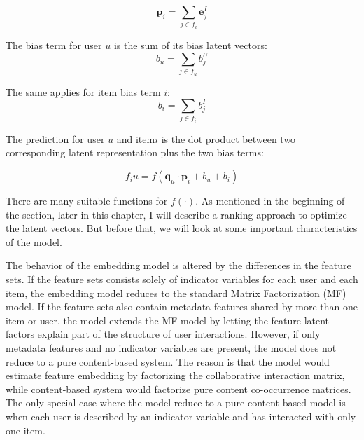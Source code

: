 \begin{displaymath}
\boldsymbol{p}_i = \sum_{j \in f_i} \boldsymbol{e}_j^I
\end{displaymath}

\noindent The bias term for user \(u\) is the sum of its bias latent vectors:
\begin{displaymath}
b_u = \sum_{j \in f_u} b_j^U
\end{displaymath}

\noindent The same applies for item bias term \(i\):
\begin{displaymath}
b_i = \sum_{j \in f_i} b_j^I
\end{displaymath}

The prediction for user \(u\) and item\(i\) is the dot product between two corresponding latent representation plus the two bias terms:

\begin{displaymath}
f_{i}u = f (\boldsymbol{q}_u  \cdot \boldsymbol{p}_i + b_u + b_i) \tag{2} \label{eq:2}
\end{displaymath}

\noindent There are many suitable functions for  \( f(\cdot)\). As mentioned in the beginning of the section, later in this chapter, I will describe a ranking approach to optimize the latent vectors. But before that, we will look at some important characteristics of the model. 

\noindent The behavior of the embedding model is altered by the differences in the feature sets. If the feature sets consists solely of indicator variables for each user and each item, the embedding model reduces to the standard Matrix Factorization (MF) model. If the feature sets also contain metadata features shared by more than one item or user, the model extends the MF model by letting the feature latent factors explain part of the structure of user interactions. However, if only metadata features and no indicator variables are present, the model does not reduce to a pure content-based system. The reason is that the model would estimate feature embedding by factorizing the collaborative interaction matrix, while content-based system would factorize pure content co-occurrence matrices. The only special case where the model reduce to a pure content-based model is when each user is described by an indicator variable and has interacted with only one item. 


